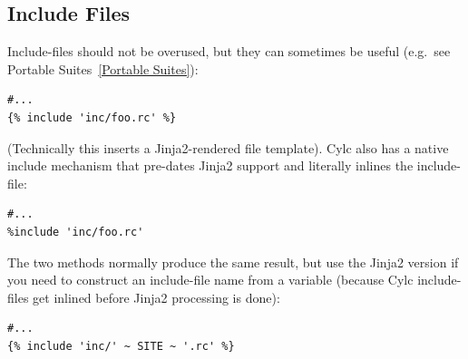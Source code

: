 \subsection{Include Files}

Include-files should not be overused, but they can sometimes be useful
(e.g.\ see Portable Suites~\ref{Portable Suites}):

\begin{lstlisting}
#...
{% include 'inc/foo.rc' %}
\end{lstlisting}

(Technically this inserts a Jinja2-rendered file template). Cylc also has a
native include mechanism that pre-dates Jinja2 support and literally inlines
the include-file:

\begin{lstlisting}
#...
%include 'inc/foo.rc'
\end{lstlisting}

The two methods normally produce the same result, but use the Jinja2 version if
you need to construct an include-file name from a variable (because Cylc
include-files get inlined before Jinja2 processing is done):

\begin{lstlisting}
#...
{% include 'inc/' ~ SITE ~ '.rc' %}
\end{lstlisting}



